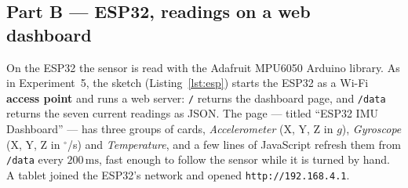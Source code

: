 \documentclass[10pt,a4paper]{article}
\begin{document}
\subsection{Part B --- ESP32, readings on a web dashboard}

On the ESP32 the sensor is read with the Adafruit MPU6050 Arduino library. As in
Experiment~5, the sketch (Listing~\ref{lst:esp}) starts the ESP32 as a Wi-Fi
\textbf{access point} and runs a web server: \texttt{/} returns the dashboard page, and
\texttt{/data} returns the seven current readings as JSON. The page --- titled
``ESP32 IMU Dashboard'' --- has three groups of cards, \emph{Accelerometer} (X, Y, Z
in $g$), \emph{Gyroscope} (X, Y, Z in $^{\circ}$/s) and \emph{Temperature}, and a few
lines of JavaScript refresh them from \texttt{/data} every $200\,\mathrm{ms}$, fast
enough to follow the sensor while it is turned by hand. A tablet joined the ESP32's
network and opened \texttt{http://192.168.4.1}.
\end{document}
